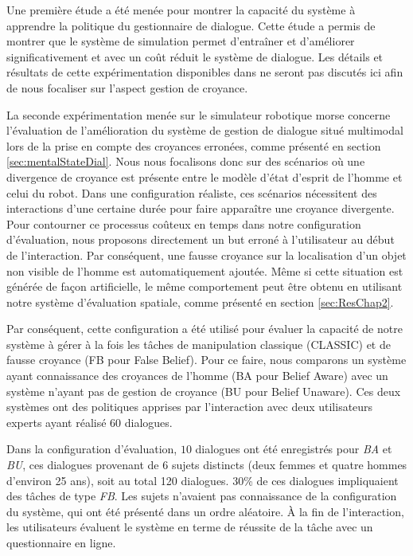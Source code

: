 \documentclass[a4paper,11pt,twoside]{StyleThese}
\begin{document}
Une première étude a été menée pour montrer la capacité du système à apprendre la politique du gestionnaire de dialogue. Cette étude a permis de montrer que le système de simulation permet d'entraîner et d'améliorer significativement et avec un coût réduit le système de dialogue. Les détails et résultats de cette expérimentation disponibles dans \cite{simpar_2014} ne seront pas discutés ici afin de nous focaliser sur l'aspect gestion de croyance.

La seconde expérimentation menée sur le simulateur robotique morse concerne l'évaluation de l'amélioration du système de gestion de dialogue situé multimodal lors de la prise en compte des croyances erronées, comme présenté en section \ref{sec:mentalStateDial}.
Nous nous focalisons donc sur des scénarios où une divergence de croyance est présente entre le modèle d'état d'esprit de l'homme et celui du robot. 
Dans une configuration réaliste, ces scénarios nécessitent des interactions d'une certaine durée pour faire apparaître une croyance divergente. Pour contourner ce processus coûteux en temps dans notre configuration d'évaluation, nous proposons directement un but erroné à l'utilisateur au début de l'interaction. 
Par conséquent, une fausse croyance sur la localisation d'un objet non visible de l'homme est automatiquement ajoutée. Même si cette situation est générée de façon artificielle, le même comportement peut être obtenu en utilisant notre système d'évaluation spatiale, comme présenté en section \ref{sec:ResChap2}.

Par conséquent, cette configuration a été utilisé pour évaluer la capacité de notre système à gérer à la fois les tâches de manipulation classique (CLASSIC) et de fausse croyance (FB pour False Belief).
Pour ce faire, nous comparons un système ayant connaissance des croyances de l'homme (BA pour Belief Aware) avec un système n'ayant pas de gestion de croyance (BU pour Belief Unaware). Ces deux systèmes ont des politiques apprises par l'interaction avec deux utilisateurs experts ayant réalisé $60$ dialogues.

Dans la configuration d'évaluation, $10$ dialogues ont été enregistrés pour \textit{BA} et \textit{BU}, ces dialogues provenant de 6 sujets distincts (deux femmes et quatre hommes d'environ 25 ans), soit au total 120 dialogues. $30$\% de ces dialogues impliquaient des tâches de type \textit{FB}. Les sujets n'avaient pas connaissance de la configuration du système, qui ont été présenté dans un ordre aléatoire. À la fin de l'interaction, les utilisateurs évaluent le système en terme de réussite de la tâche avec un questionnaire en ligne.
\end{document}
